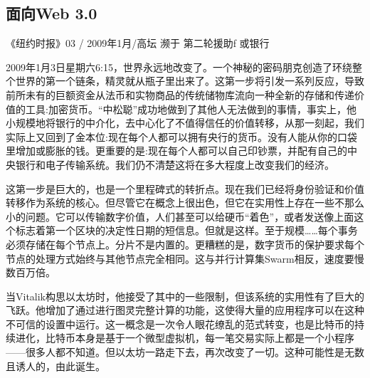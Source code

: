 \subsection{面向Web 3.0 \statusgreen}\label{sec:towards-web3}


\begin{centerverbatim}
《纽约时报》03 /
2009年1月/高坛
濒于
第二轮援助f
或银行
\end{centerverbatim}

2009年1月3日星期六6:15，世界永远地改变了。一个神秘的密码朋克创造了环绕整个世界的第一个链条，精灵就从瓶子里出来了。这第一步将引发一系列反应，导致前所未有的巨额资金从法币和实物商品的传统储物库流向一种全新的存储和传递价值的工具:加密货币。“中松聪”成功地做到了其他人无法做到的事情，事实上，他小规模地将银行的中介化，去中心化了不值得信任的价值转移，从那一刻起，我们实际上又回到了金本位:现在每个人都可以拥有央行的货币。没有人能从你的口袋里增加或膨胀的钱。更重要的是:现在每个人都可以自己印钞票，并配有自己的中央银行和电子传输系统。我们仍不清楚这将在多大程度上改变我们的经济。

这第一步是巨大的，也是一个里程碑式的转折点。现在我们已经将身份验证和价值转移作为系统的核心。但尽管它在概念上很出色，但它在实用性上存在一些不那么小的问题。它可以传输数字价值，人们甚至可以给硬币“着色”，或者发送像上面这个标志着第一个区块的决定性日期的短信息。但就是这样。至于规模……每个事务必须存储在每个节点上。分片不是内置的。更糟糕的是，数字货币的保护要求每个节点的处理方式始终与其他节点完全相同。这与并行计算集Swarm相反，速度要慢数百万倍。

当Vitalik构思以太坊时，他接受了其中的一些限制，但该系统的实用性有了巨大的飞跃。他增加了通过进行图灵完整计算的功能，这使得大量的应用程序可以在这种不可信的设置中运行。这一概念是一次令人眼花缭乱的范式转变，也是比特币的持续进化，比特币本身是基于一个微型虚拟机，每一笔交易实际上都是一个小程序——很多人都不知道。但以太坊一路走下去，再次改变了一切。这种可能性是无数且诱人的，由此诞生。

